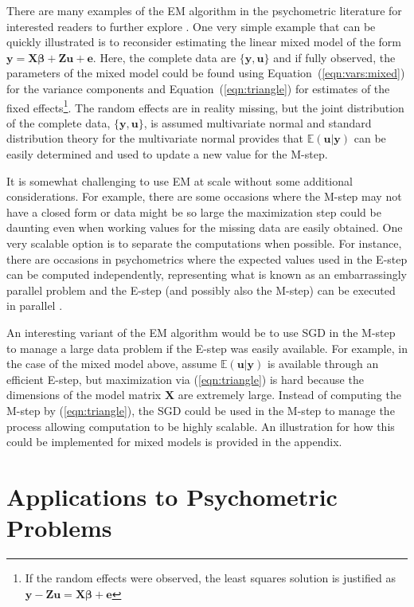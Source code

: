\documentclass[12pt]{article}
\begin{document}
There are many examples of the EM algorithm in the psychometric literature for interested readers to further explore \cite{Hsu1999TheRB}. One very simple example that can be quickly illustrated is to reconsider estimating the linear mixed model of the form $\bm{y} = \bm{X}\bm{\beta} + \bm{Z}\bm{u} + \bm{e}$. Here, the complete data are $\{\bm{y}, \bm{u}\}$ and if fully observed, the parameters of the mixed model could be found using Equation~(\ref{eqn:vars:mixed}) for the variance components and Equation~(\ref{eqn:triangle}) for estimates of the fixed effects\footnote{If the random effects were observed, the least squares solution is justified as $\bm{y} -\bm{Z}\bm{u} = \bm{X}\bm{\beta} + \bm{e}$}. The random effects are in reality missing, but the joint distribution of the complete data, $\{\bm{y}, \bm{u}\}$, is assumed multivariate normal and standard distribution theory for the multivariate normal provides that $\mathbb{E}(\bm{u}|\bm{y})$ can be easily determined \cite{mcandsearle:2001} and used to update a new value for the M-step.  

It is somewhat challenging to use EM at scale without some additional considerations. For example, there are some occasions where the M-step may not have a closed form or data might be so large the maximization step could be daunting even when working values for the missing data are easily obtained. One very scalable option is to separate the computations when possible. For instance, there are occasions in psychometrics where the expected values used in the E-step can be computed independently, representing what is known as an embarrassingly parallel problem and the E-step (and possibly also the M-step) can be executed in parallel \cite{lee,robitzsch,Davier2016HighPerformancePT}. 

An interesting variant of the EM algorithm would be to use SGD in the M-step to manage a large data problem if the E-step was easily available. For example, in the case of the mixed model above, assume $\mathbb{E}(\bm{u}|\bm{y})$ is available through an efficient E-step, but maximization via (\ref{eqn:triangle}) is hard because the dimensions of the model matrix $\bm{X}$ are extremely large. Instead of computing the M-step by (\ref{eqn:triangle}), the SGD could be used in the M-step to manage the process allowing computation to be highly scalable. An illustration for how this could be implemented for mixed models is provided in the appendix. 

\section*{Applications to Psychometric Problems}
\end{document}
